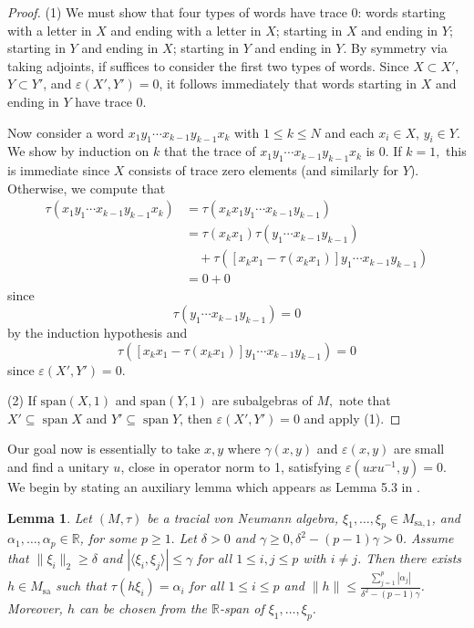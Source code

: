 \documentclass[10pt]{amsart}
\numberwithin{equation}{section}
\newtheorem{lem}[thm]{Lemma}
\theoremstyle{definition}
\newcommand{\R}{\mathbb{R}}
\newcommand{\ee}{\varepsilon}
\begin{document}
\begin{proof}
    (1) We must show that four types of words have trace 0: words starting with a letter in $X$ and ending with a letter in $X$; starting in $X$ and ending in $Y$; starting in $Y$ and ending in $X$; starting in $Y$ and ending in $Y$. By symmetry via taking adjoints, if suffices to consider the first two types of words. Since $X\subset X'$, $Y\subset Y'$, and $\ee(X',Y')=0$, it follows immediately that words starting in $X$ and ending in $Y$ have trace 0.

    Now consider a word $x_1y_1\cdots x_{k-1}y_{k-1}x_k$ with $1\le k\le N$ and each $x_i\in X$, $y_i\in Y$. We show by induction on $k$ that the trace of $x_1y_1\cdots x_{k-1}y_{k-1}x_k$ is 0. If $k=1,$ this is immediate since $X$ consists of trace zero elements (and similarly for $Y$). Otherwise, we compute that
    \begin{align*}
        \tau(x_1y_1\cdots x_{k-1}y_{k-1}x_k) &= \tau(x_kx_1y_1\cdots x_{k-1}y_{k-1}) \\
        &= \tau(x_kx_1)\tau(y_1\cdots x_{k-1}y_{k-1}) \\
        &\quad + \tau([x_kx_1 - \tau(x_kx_1)]y_1\cdots x_{k-1}y_{k-1}) \\
        &= 0 + 0
    \end{align*}
    since $$\tau(y_1\cdots x_{k-1}y_{k-1}) = 0$$ by the induction hypothesis and $$\tau([x_kx_1 - \tau(x_kx_1)]y_1\cdots x_{k-1}y_{k-1}) = 0$$ since $\ee(X',Y')=0.$

    (2) If $\mathrm{span}(X,1)$ and $\mathrm{span}(Y,1)$ are subalgebras of $M,$ note that $X' \subseteq \operatorname{span} X$ and $Y' \subseteq \operatorname{span}Y$, then  $\ee (X',Y')=0$ and apply (1).
\end{proof}

Our goal now is essentially to take $x,y$ where $\gamma(x,y)$ and $\ee(x,y)$ are small and find a unitary $u$, close in operator norm to 1, satisfying $\ee(uxu^{-1},y) = 0$. We begin by stating an auxiliary lemma which appears as Lemma 5.3 in \cite{houdayer2023asymptotic}.

\begin{lem}\label{lem-lin-indep}
    Let $(M,\tau)$ be a tracial von Neumann algebra, $\xi_1,\ldots,\xi_p\in M_{\mathrm{sa},1}$, and $\alpha_1,\ldots,\alpha_p\in \R$, for some $p\ge 1.$ Let $\delta>0$ and $\gamma \ge 0, \delta^2 - (p-1)\gamma>0$. Assume that $\|\xi_i\|_2 \ge \delta$ and $|\langle \xi_i,\xi_j\rangle| \le \gamma$ for all $1\le i,j\le p$ with $i\ne j$. Then there exists $h\in M_{\mathrm{sa}}$ such that $\tau(h\xi_i) = \alpha_i$ for all $1\le i \le p$ and $\|h\| \le \frac{\sum_{j=1}^p|\alpha_j|}{\delta^2-(p-1)\gamma}$. Moreover, $h$ can be chosen from the $\R$-span of $\xi_1,\ldots,\xi_p$.
\end{lem}
\end{document}
